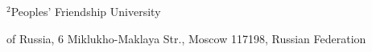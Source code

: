 \noindent


$^2$Peoples' Friendship University


of Russia, 6 Miklukho-Maklaya Str., Moscow 117198, Russian Federation








\def\leftfootline{\small{\textbf{\thepage}


\hfill INFORMATIKA I EE PRIMENENIYA~--- INFORMATICS AND


APPLICATIONS\ \ \ 2015\ \ \ volume~9\ \ \ issue\ 3}


}%


 \def\rightfootline{\small{INFORMATIKA I EE PRIMENENIYA~---


INFORMATICS AND APPLICATIONS\ \ \ 2015\ \ \ volume~9\ \ \ issue\ 3


\hfill \textbf{\thepage}}}





\vspace*{3pt}








